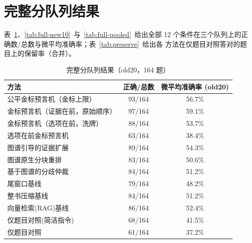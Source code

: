 \documentclass[UTF8,11pt]{ctexart}
\begin{document}
\appendix
\section{完整分队列结果}
\label{app:full}

表~\ref{tab:full-old20}、\ref{tab:full-new10}~与~\ref{tab:full-pooled}~给出全部
12 个条件在三个队列上的正确数/总数与微平均准确率；表~\ref{tab:preserve}~给出各
方法在仅题目对照答对的题目上的保留率（合并）。

\begin{table}[t]
\centering
\caption{完整分队列结果（old20，164 题）}
\label{tab:full-old20}
\small
\begin{tabular}{lcc}
\toprule
方法 & 正确/总数 & 微平均准确率 (old20) \\
\midrule
公平金标预言机（金标上限） & 93/164 & 56.7\% \\
金标预言机（证据在前，原始顺序） & 97/164 & 59.1\% \\
金标预言机（选项在前，洗牌） & 88/164 & 53.7\% \\
选项在前金标预言机 & 63/164 & 38.4\% \\
图谱引导的证据扩展 & 89/164 & 54.3\% \\
图谱原生分块重排 & 83/164 & 50.6\% \\
基于图谱的分歧仲裁 & 84/164 & 51.2\% \\
尾窗口基线 & 79/164 & 48.2\% \\
整书压缩基线 & 84/164 & 51.2\% \\
向量检索(RAG)基线 & 86/164 & 52.4\% \\
仅题目对照(简洁指令) & 68/164 & 41.5\% \\
仅题目对照 & 61/164 & 37.2\% \\
\bottomrule
\end{tabular}
\end{table}
\end{document}
